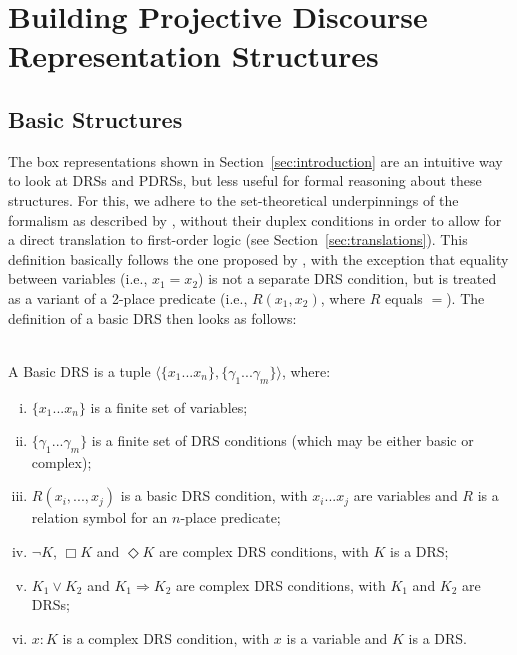 \section{Building Projective Discourse Representation Structures}
\label{sec:building}


\subsection{Basic Structures}

The box representations shown in Section~\ref{sec:introduction} are an
intuitive way to look at DRSs and PDRSs, but less useful for formal
reasoning about these structures. For this, we adhere to the set-theoretical
underpinnings of the formalism as described by
, without their duplex conditions in order to
allow for a direct translation to first-order logic (see
Section~\ref{sec:translations}). This definition basically follows the one
proposed by , with the exception that
equality between variables (i.e., $x_1=x_2$) is not a separate DRS
condition, but is treated as a variant of a 2-place predicate (i.e.,
$R(x_1,x_2)$, where $R$ equals $=$). The definition of a basic DRS then
looks as follows:

\begin{definition} \label{def:bDRS}~\\
A Basic DRS is a tuple $\langle \{x_1 ... x_n\},\{\gamma_1 ... \gamma_m\} 
\rangle$, where:
 \begin{enumerate}[i.]
  \item $\{x_1 ... x_n\}$ is a finite set of variables;
  \item $\{\gamma_1 ... \gamma_m\}$ is a finite set of DRS conditions (which
    may be either basic or complex);
  \item\label{def:bDRS:Rel} $R(x_i, ..., x_j)$ is a basic DRS condition,
    with $x_i ... x_j$ are variables and $R$ is a relation symbol for an
    $n$-place predicate;
  \item $\neg K$, $\Box K$ and $\Diamond K$ are complex DRS conditions, with
    $K$ is a DRS;
  \item $K_1 \vee K_2$ and $K_1 \Rightarrow K_2$ are complex DRS conditions,
    with $K_1$ and $K_2$ are DRSs;
  \item \label{def:bDRS:Prop} $x:K$ is a complex DRS condition, with $x$ is
    a variable and $K$ is a DRS.
 \end{enumerate} 
\end{definition}

